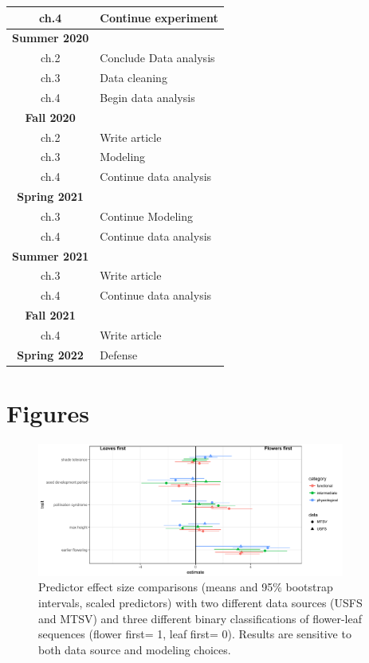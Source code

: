 \documentclass{article}\usepackage[]{graphicx}\usepackage[]{color}
\begin{document}
\begin{center}
\begin{tabular}{|c|l|}
ch.4 & Continue experiment\\
\hline
\textbf{Summer 2020}& \\
ch.2 & Conclude Data analysis\\
ch.3 & Data cleaning\\
ch.4 & Begin data analysis\\
\hline
\textbf{Fall 2020}& \\
ch.2 & Write article\\
ch.3 & Modeling\\
ch.4 & Continue data analysis\\
\hline
\textbf{Spring 2021}& \\
ch.3 & Continue Modeling\\
ch.4 & Continue data analysis\\
\hline
\textbf{Summer 2021}& \\
ch.3 & Write article\\
ch.4 & Continue data analysis\\
\hline
\textbf{Fall 2021}& \\
ch.4 & Write article\\
\hline
\textbf{Spring 2022}& Defense \\
\hline
\end{tabular}
\end{center}


\pagebreak
\section*{Figures}
\begin{figure}[here]
\includegraphics[width=0.9\textwidth]{..//figures/MTSV_v_USFS_comp.pdf}
\caption{Predictor effect size comparisons (means and 95\% bootstrap intervals, scaled predictors) with two different data sources (USFS and MTSV) and three different binary classifications of flower-leaf sequences (flower first= 1, leaf first= 0). Results are sensitive to both data source and modeling choices.}
\label{fig:Figure 1}
\end{figure}
\end{document}
